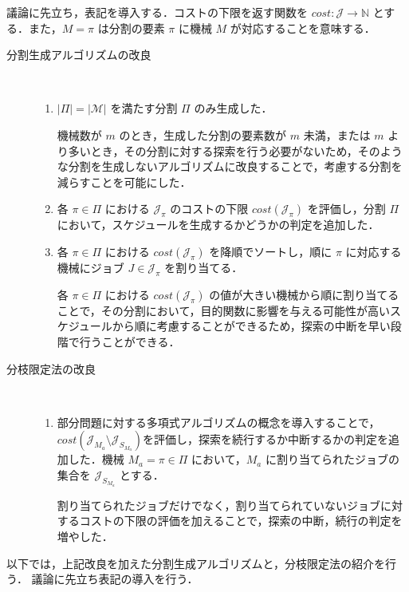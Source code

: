 \documentclass[12pt]{optlab-bachelor}
\begin{document}
議論に先立ち，表記を導入する．コストの下限を返す関数を $cost : \mathcal{J} \to \mathbb{N}$ とする．また，$M = \pi$ は分割の要素 $\pi$ に機械 $M$ が対応することを意味する．
\begin{description}
  \item[分割生成アルゴリズムの改良] ~
  \begin{enumerate}
    \setlength{\leftskip}{-10mm}
    \item $|\Pi| = |\mathcal{M}|$ を満たす分割 $\Pi$ のみ生成した．

    機械数が $m$ のとき，生成した分割の要素数が $m$ 未満，または $m$ より多いとき，その分割に対する探索を行う必要がないため，そのような分割を生成しないアルゴリズムに改良することで，考慮する分割を減らすことを可能にした．

    \item 各 $\pi \in \Pi$ における $\mathcal{J}_{\pi}$ のコストの下限 $cost(\mathcal{J}_{\pi})$ を評価し，分割 $\Pi$ において，スケジュールを生成するかどうかの判定を追加した．

    \item 各 $\pi \in \Pi$ における $cost(\mathcal{J}_{\pi})$ を降順でソートし，順に $\pi$ に対応する機械にジョブ $J \in \mathcal{J}_{\pi}$ を割り当てる．

    各 $\pi \in \Pi$ における $cost(\mathcal{J}_{\pi})$ の値が大きい機械から順に割り当てることで，その分割において，目的関数に影響を与える可能性が高いスケジュールから順に考慮することができるため，探索の中断を早い段階で行うことができる．

  \end{enumerate}
  \item[分枝限定法の改良] ~
  \begin{enumerate}
    \setlength{\leftskip}{-10mm}
    \item 部分問題に対する多項式アルゴリズムの概念を導入することで，$cost(\mathcal{J}_{M_a} \setminus \mathcal{J}_{S_{M_a}})$を評価し，探索を続行するか中断するかの判定を追加した．機械 $M_a = \pi \in \Pi$ において，$M_a$ に割り当てられたジョブの集合を $\mathcal{J}_{S_{M_a}}$ とする．

    割り当てられたジョブだけでなく，割り当てられていないジョブに対するコストの下限の評価を加えることで，探索の中断，続行の判定を増やした．
  \end{enumerate}
\end{description}

以下では，上記改良を加えた分割生成アルゴリズムと，分枝限定法の紹介を行う．
議論に先立ち表記の導入を行う．
\end{document}
